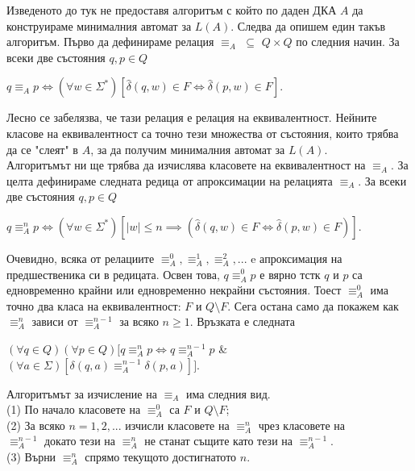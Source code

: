 \documentclass[openany]{book}
\begin{document}
            \hspace{15pt} Изведеното до тук не предоставя алгоритъм с който по даден ДКА $A$
            да конструираме минималния автомат за $L(A)$. Следва да опишем един такъв алгоритъм.
            Първо да дефинираме релация 
            $\equiv_A$ $\subseteq$ $Q \times Q$ по следния начин. За всеки две състояния
            $q,p \in Q$
            \begin{center}
                $q \equiv_A p \iff (\forall w \in \Sigma^*)[\hat{\delta}(q,w) \in F \iff \hat{\delta}(p,w) \in F]$.
            \end{center}
            Лесно се забелязва, че тази релация е релация на еквивалентност. Нейните класове
            на еквивалентност са точно тези множества от състояния, които трябва да се "слеят"
            \hspace{0,01cm} в $A$, за да получим минималния автомат за $L(A)$. \\
            \hspace{15pt} Алгоритъмът ни ще трябва да изчислява класовете на еквивалентност на
            $\equiv_A$. За целта дефинираме следната редица от апроксимации на релацията 
            $\equiv_A$. За всеки две състояния $q,p \in Q$ 
            \begin{center}
                $q \equiv_A^n p \iff (\forall w \in \Sigma^*)[|w| \leq n \implies (\hat{\delta}(q,w) \in F \iff \hat{\delta}(p,w) \in F)]$.
            \end{center}
            \hspace{15pt} Очевидно, всяка от релациите $\equiv_A^0,\equiv_A^1,\equiv_A^2,...$
            e апроксимация на предшественика си в редицата. Освен това, $q \equiv_A^0 p$ е вярно
            тстк $q$ и $p$ са едновременно крайни или едновременно некрайни състояния. Тоест
            $\equiv_A^0$ има точно два класа на еквивалентност: $F$ и $Q \setminus F$. Сега
            остана само да покажем как $\equiv_A^n$ зависи от $\equiv_A^{n-1}$ за всяко
            $n \geq 1$. Връзката е следната
            \begin{center}
                $(\forall q \in Q)(\forall p \in Q)[q \equiv_A^n p \iff q \equiv_A^{n-1} p$ \& $(\forall a \in \Sigma)[\delta(q,a) \equiv_A^{n-1} \delta(p,a)]]$.
            \end{center}
            Алгоритъмът за изчисление на $\equiv_A$ има следния вид. \\
            \vspace{5pt}
            \hspace{15pt} (1) По начало класовете на $\equiv_A^0$ са $F$ и $Q \setminus F$; \\
            \hspace{15pt} (2) За всяко $n = 1,2,...$ изчисли класовете на $\equiv_A^n$ чрез класовете на \\
            \hspace{34pt}$\equiv_A^{n-1}$ докато тези на $\equiv_A^n$ не станат същите като тези на
            $\equiv_A^{n-1}$. \\
            \hspace{15pt} (3) Върни $\equiv_A^n$ спрямо текущото достигнатото $n$.
        
\end{document}
